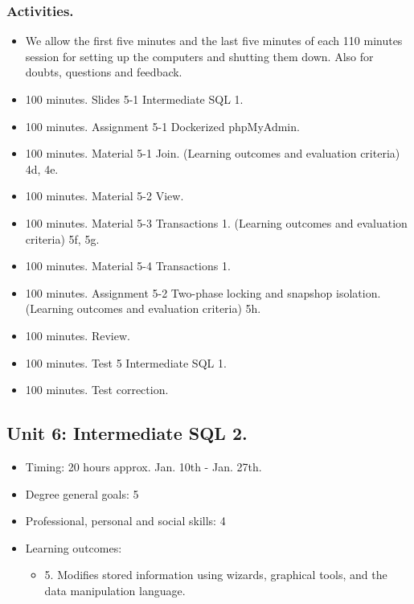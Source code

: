 \documentclass[catalan, a4paper, 12pt, titlepage]{article}
\begin{document}
  \subsubsection{Activities.}

  \begin{itemize}
          \item We allow the first five minutes and the last five minutes of each 110 minutes session for setting up the computers and shutting them down. Also for doubts, questions and feedback.
	  \item 100 minutes. Slides 5-1 Intermediate SQL 1.
	  \item 100 minutes. Assignment 5-1 Dockerized phpMyAdmin.
	  \item 100 minutes. Material 5-1 Join. (\faGraduationCap Learning outcomes and evaluation criteria) 4d, 4e.
	  \item 100 minutes. Material 5-2 View.
	  \item 100 minutes. Material 5-3 Transactions 1. (\faGraduationCap Learning outcomes and evaluation criteria) 5f, 5g.
	  \item 100 minutes. Material 5-4 Transactions 1.
	  \item 100 minutes. Assignment 5-2 Two-phase locking and snapshop isolation. (\faGraduationCap Learning outcomes and evaluation criteria) 5h.
	  \item 100 minutes. Review.
	  \item 100 minutes. Test 5 Intermediate SQL 1.
	  \item 100 minutes. Test correction.
  \end{itemize}

  \subsection{Unit 6: Intermediate SQL 2.}

  \begin{itemize}
	\item Timing: 20 hours approx. Jan. 10th - Jan. 27th.
	\item Degree general goals: 5
	\item Professional, personal and social skills: 4
	\item Learning outcomes: 
		\begin{itemize}
			\item 5. Modifies stored information using wizards, graphical tools, and the data manipulation language.
		\end{itemize}
  \end{itemize}
  
\end{document}
